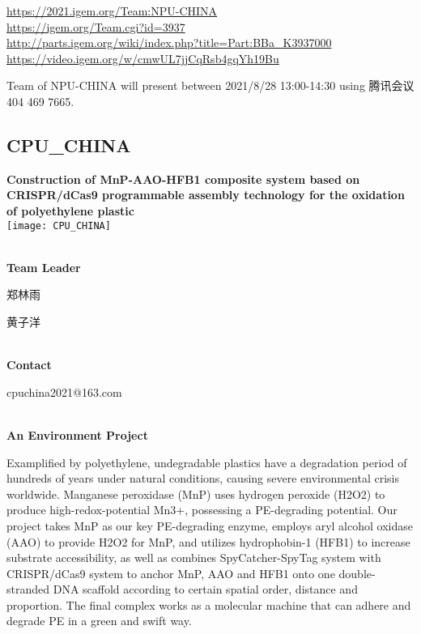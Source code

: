 \url{https://2021.igem.org/Team:NPU-CHINA }\\
\url{https://igem.org/Team.cgi?id=3937 }\\
\url{http://parts.igem.org/wiki/index.php?title=Part:BBa_K3937000 }\\
\url{https://video.igem.org/w/cmwUL7jjCqRsb4gqYh19Bu }\\

\vfill{}









Team of NPU-CHINA will present between      2021/8/28 13:00-14:30   using 腾讯会议 404 469 7665.
\newpage


\subsection{\textcolor{Blu}{ CPU\_CHINA } }
\vspace{5mm}
\begin{center}
\large{
  \textbf{ Construction of MnP-AAO-HFB1 composite system based on CRISPR/dCas9 programmable assembly technology for the oxidation of polyethylene plastic }\\

  \texttt{[image: CPU\_CHINA]}
}
\end{center}
\textbf{\\Team Leader}

  郑林雨

  黄子洋


\textbf{\\Contact}

  cpuchina2021@163.com

\textbf{\\An Environment Project\\}\begin{spacing}{1.5}

Examplified by polyethylene, undegradable plastics have a degradation period of hundreds of years under natural conditions, causing severe environmental crisis worldwide. Manganese peroxidase (MnP) uses hydrogen peroxide (H2O2) to produce high-redox-potential Mn3+, possessing a PE-degrading potential. Our project takes MnP as our key PE-degrading enzyme, employs aryl alcohol oxidase (AAO) to provide H2O2 for MnP, and utilizes hydrophobin-1 (HFB1) to increase substrate accessibility, as well as combines SpyCatcher-SpyTag system with CRISPR/dCas9 system to anchor MnP, AAO and HFB1 onto one double-stranded DNA scaffold according to certain spatial order, distance and proportion. The final complex works as a molecular machine that can adhere and degrade PE in a green and swift way.\end{spacing}
\\


